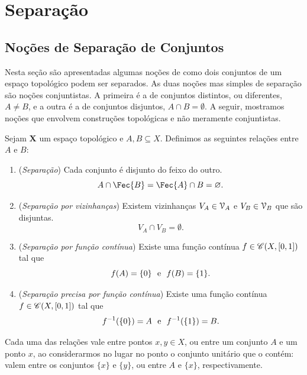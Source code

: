 \section{Separação}

\subsection{Noções de Separação de Conjuntos}

Nesta seção são apresentadas algumas noções de como dois conjuntos de um espaço topológico podem ser separados. As duas noções mas simples de separação são noções conjuntistas. A primeira é a de conjuntos distintos, ou diferentes, $A \neq B$, e a outra é a de conjuntos disjuntos, $A \cap B = \emptyset$. A seguir, mostramos noções que envolvem construções topológicas e não meramente conjuntistas.

\begin{defi}
Sejam $\bm X$ um espaço topológico e $A,B \subseteq X$. Definimos as seguintes relações entre $A$ e $B$:
	\begin{enumerate}
	\item (\emph{Separação}) Cada conjunto é disjunto do feixo do outro.
	\begin{equation*}
	A \cap \Fec{B} = \Fec{A} \cap B = \emptyset.
	\end{equation*}
	\item (\emph{Separação por vizinhanças}) Existem vizinhanças $V_A \in \mathcal{V}_A$ e $V_B \in \mathcal{V}_B$ que são disjuntas.
	\begin{equation*}
	V_A \cap V_B = \emptyset.
	\end{equation*}
	\item (\emph{Separação por função contínua}) Existe uma função contínua $f \in \mathscr{C}(X,[0,1])$ tal que
	\begin{equation*}
	f(A)=\{0\} \text{\ \ e\ \ } f(B)=\{1\}.
	\end{equation*}
	\item (\emph{Separação precisa por função contínua}) Existe uma função contínua $f \in \mathscr{C}(X,[0,1])$ tal que
	\begin{equation*}
	f^{-1}(\{0\})=A \text{\ \ e\ \ } f^{-1}(\{1\})=B.
	\end{equation*}
	\end{enumerate}
Cada uma das relações vale entre pontos $x,y \in X$, ou entre um conjunto $A$ e um ponto $x$, ao considerarmos no lugar no ponto o conjunto unitário que o contém: valem entre os conjuntos $\{x\}$ e $\{y\}$, ou entre $A$ e $\{x\}$, respectivamente.
\end{defi}

